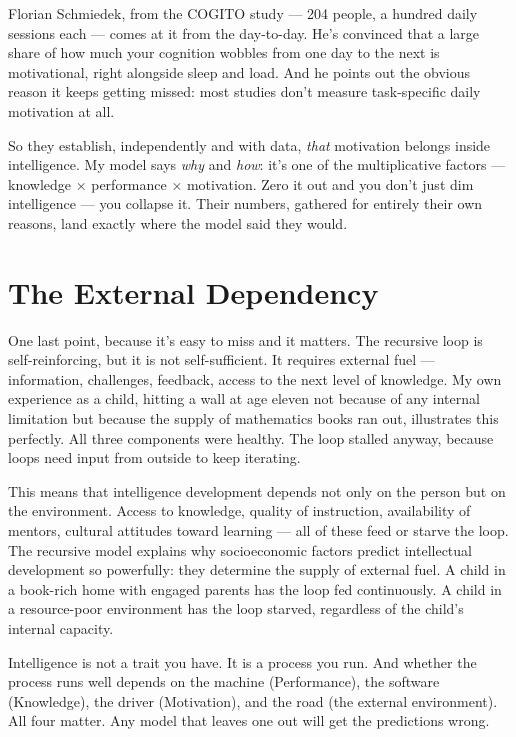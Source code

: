 \documentclass[11pt, twoside, openright]{book}
\begin{document}
Florian Schmiedek, from the COGITO study --- 204 people, a hundred daily sessions each --- comes at it from the day-to-day. He's convinced that a large share of how much your cognition wobbles from one day to the next is motivational, right alongside sleep and load. And he points out the obvious reason it keeps getting missed: most studies don't measure task-specific daily motivation at all.

So they establish, independently and with data, \textit{that} motivation belongs inside intelligence. My model says \textit{why} and \textit{how}: it's one of the multiplicative factors --- knowledge × performance × motivation. Zero it out and you don't just dim intelligence --- you collapse it. Their numbers, gathered for entirely their own reasons, land exactly where the model said they would.

\section*{The External Dependency}

One last point, because it's easy to miss and it matters. The recursive loop is self-reinforcing, but it is not self-sufficient. It requires external fuel --- information, challenges, feedback, access to the next level of knowledge. My own experience as a child, hitting a wall at age eleven not because of any internal limitation but because the supply of mathematics books ran out, illustrates this perfectly. All three components were healthy. The loop stalled anyway, because loops need input from outside to keep iterating.

This means that intelligence development depends not only on the person but on the environment. Access to knowledge, quality of instruction, availability of mentors, cultural attitudes toward learning --- all of these feed or starve the loop. The recursive model explains why socioeconomic factors predict intellectual development so powerfully: they determine the supply of external fuel. A child in a book-rich home with engaged parents has the loop fed continuously. A child in a resource-poor environment has the loop starved, regardless of the child's internal capacity.

Intelligence is not a trait you have. It is a process you run. And whether the process runs well depends on the machine (Performance), the software (Knowledge), the driver (Motivation), and the road (the external environment). All four matter. Any model that leaves one out will get the predictions wrong.
\end{document}
